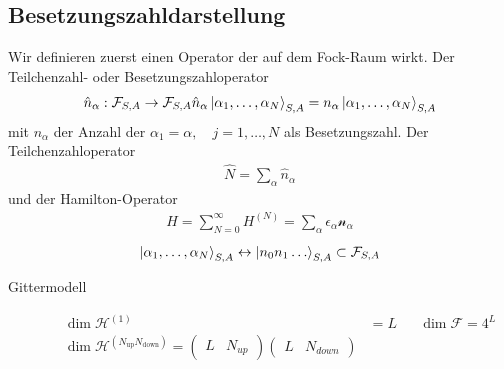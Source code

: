 \subsection*{Besetzungszahldarstellung}
Wir definieren zuerst einen Operator der auf dem Fock-Raum wirkt.
Der Teilchenzahl- oder Besetzungszahloperator
%
\begin{align*}
  \hat{n}_\alpha: \mathcal{F}_{S,A} \to \mathcal{F}_{S,A}
  \hat{n}_\alpha \Ket{\alpha_1, \ldots, \alpha_N}_{S,A} = 
  n_\alpha \Ket{\alpha_1, \ldots ,\alpha_N }_{S,A}
\end{align*}
%
mit $n_\alpha$ der Anzahl der $\alpha_1 = \alpha, \quad j=1, \ldots ,N$
als Besetzungszahl.
Der Teilchenzahloperator
%
\begin{align*}
  \hat{N} = \sum_{\alpha}^{} \hat{n}_{\alpha}
\end{align*}
%
und der Hamilton-Operator
%
\begin{align*}
  H = \sum_{N=0}^{\infty} H^{(N)}  = \sum_{\alpha}^{} \epsilon_\alpha \mathcal{n}_\alpha
\end{align*}
%
%
\begin{align*}
  \Ket{\alpha_1, \ldots, \alpha_N}_{S,A} \leftrightarrow \Ket{n_0 n_1 \ldots}_{S,A} \subset \mathcal{F}_{S,A}
\end{align*}
%
\begin{description}
  \item[Gittermodell] 
    \begin{align*}
      \operatorname{dim} \mathcal{H}^{(1)} & = L && \operatorname{dim} \mathcal{F} = 4^L \\
      \operatorname{dim} \mathcal{H}^{(N_\text{up} N_\text{down})} = 
      \begin{pmatrix}
        L & N_{up} 
      \end{pmatrix} 
      \begin{pmatrix}
        L & N_{down} 
      \end{pmatrix} 
    \end{align*}
\end{description}

